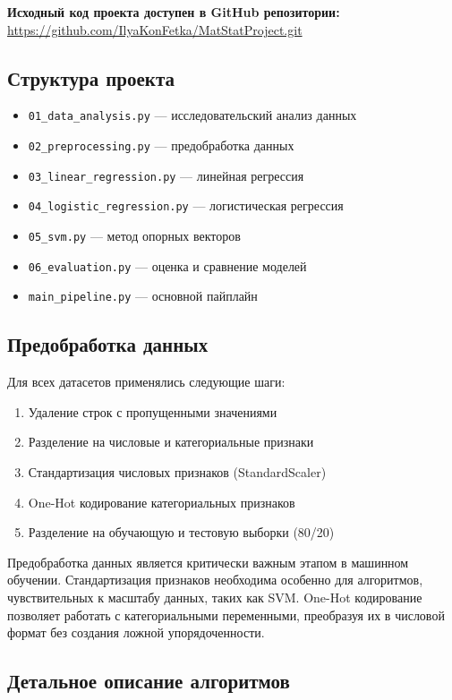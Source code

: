 \documentclass[a4paper]{article}
\begin{document}
\textbf{Исходный код проекта доступен в GitHub репозитории:}
\url{https://github.com/IlyaKonFetka/MatStatProject.git}

\subsection{Структура проекта}
\begin{itemize}
    \item \texttt{01\_data\_analysis.py} — исследовательский анализ данных
    \item \texttt{02\_preprocessing.py} — предобработка данных
    \item \texttt{03\_linear\_regression.py} — линейная регрессия
    \item \texttt{04\_logistic\_regression.py} — логистическая регрессия
    \item \texttt{05\_svm.py} — метод опорных векторов
    \item \texttt{06\_evaluation.py} — оценка и сравнение моделей
    \item \texttt{main\_pipeline.py} — основной пайплайн
\end{itemize}

\subsection{Предобработка данных}
Для всех датасетов применялись следующие шаги:
\begin{enumerate}
    \item Удаление строк с пропущенными значениями
    \item Разделение на числовые и категориальные признаки
    \item Стандартизация числовых признаков (StandardScaler)
    \item One-Hot кодирование категориальных признаков
    \item Разделение на обучающую и тестовую выборки (80/20)
\end{enumerate}

Предобработка данных является критически важным этапом в машинном обучении. Стандартизация признаков необходима особенно для алгоритмов, чувствительных к масштабу данных, таких как SVM. One-Hot кодирование позволяет работать с категориальными переменными, преобразуя их в числовой формат без создания ложной упорядоченности.

\subsection{Детальное описание алгоритмов}
\end{document}

